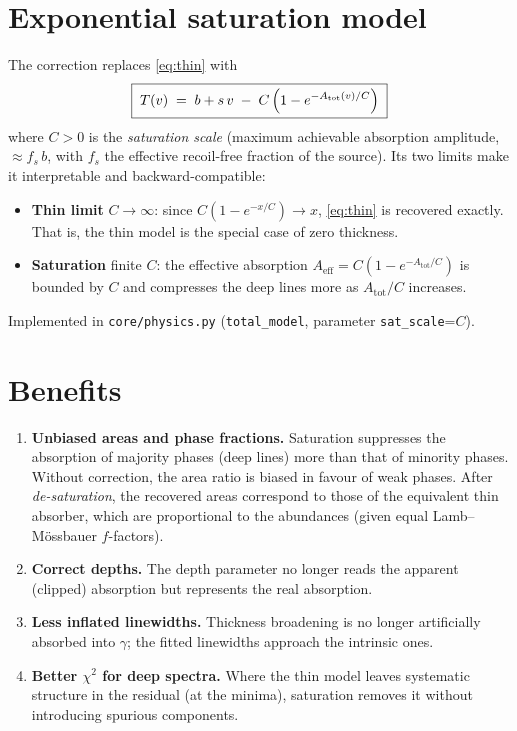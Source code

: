 \documentclass[11pt,a4paper]{article}
\newcommand{\code}[1]{\texttt{\small #1}}
\begin{document}
\section{Exponential saturation model}

The correction replaces \eqref{eq:thin} with
\begin{equation}
  \boxed{\;
  T(v) \;=\; b + s\,v \;-\; C\,\Bigl(1 - e^{-A_{\text{tot}}(v)/C}\Bigr)
  \;}
  \label{eq:thick}
\end{equation}
where $C>0$ is the \emph{saturation scale} (maximum achievable absorption amplitude,
$\approx f_s\,b$, with $f_s$ the effective recoil-free fraction of the source).
Its two limits make it interpretable and backward-compatible:
\begin{itemize}[leftmargin=*]
  \item \textbf{Thin limit} $C\to\infty$: since $C(1-e^{-x/C})\to x$,
        \eqref{eq:thin} is recovered exactly. That is, the thin model is the
        special case of zero thickness.
  \item \textbf{Saturation} finite $C$: the effective absorption
        $A_{\text{eff}}=C(1-e^{-A_{\text{tot}}/C})$ is bounded by $C$ and
        compresses the deep lines more as $A_{\text{tot}}/C$ increases.
\end{itemize}
Implemented in \code{core/physics.py} (\code{total\_model}, parameter
\code{sat\_scale}=$C$).

\section{Benefits}

\begin{enumerate}[leftmargin=*]
  \item \textbf{Unbiased areas and phase fractions.} Saturation suppresses the
        absorption of majority phases (deep lines) more than that of minority
        phases. Without correction, the area ratio is biased in favour of
        weak phases. After \emph{de-saturation}, the recovered areas correspond
        to those of the equivalent thin absorber, which are proportional to
        the abundances (given equal Lamb--M\"{o}ssbauer $f$-factors).
  \item \textbf{Correct depths.} The depth parameter no longer reads the
        apparent (clipped) absorption but represents the real absorption.
  \item \textbf{Less inflated linewidths.} Thickness broadening is no longer
        artificially absorbed into $\gamma$; the fitted linewidths approach
        the intrinsic ones.
  \item \textbf{Better $\chi^2$ for deep spectra.} Where the thin model leaves
        systematic structure in the residual (at the minima), saturation
        removes it without introducing spurious components.
\end{enumerate}
\end{document}
